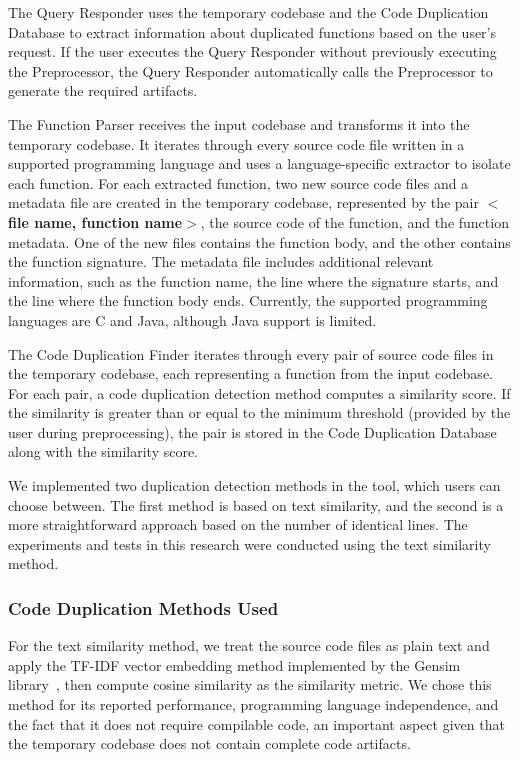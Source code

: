 \documentclass[conference]{IEEEtran}
\begin{document}
The Query Responder uses the temporary codebase and the Code Duplication Database to extract 
information about duplicated functions based on the user's request. If the user executes the Query Responder
without previously executing the Preprocessor, the Query Responder automatically 
calls the Preprocessor to generate the required artifacts.

The Function Parser receives the input codebase and transforms it into the temporary
codebase. It iterates through every source code file written in a supported programming 
language and uses a language-specific extractor to isolate each function. For each extracted 
function, two new source code files and a metadata file are created in the temporary codebase, 
represented by the pair \textbf{$<$file name, function name$>$}, the source code of the function, 
and the function metadata. One of the new files contains the function body, and the other 
contains the function signature. The metadata file includes additional relevant information,
such as the function name, the line where the signature starts, and the line where the function 
body ends. Currently, the supported programming languages are C and Java, although Java support is limited.

The Code Duplication Finder iterates through every pair of source code files in the
temporary codebase, each representing a function from the input codebase. For each pair,
a code duplication detection method computes a similarity score. If the similarity is greater 
than or equal to the minimum threshold (provided by the user during preprocessing), the pair 
is stored in the Code Duplication Database along with the similarity score.

We implemented two duplication detection methods in the tool, which users can choose 
between. The first method is based on text similarity, and the second is a more straightforward approach 
based on the number of identical lines. The experiments and tests in this research were 
conducted using the text similarity method.


\subsubsection{Code Duplication Methods Used}

For the text similarity method, we treat the source code files as plain text and apply the
TF-IDF vector embedding method implemented by the Gensim library~\cite{gensim},
then compute cosine similarity as the similarity metric. We chose this method for 
its reported performance, programming language independence, and the fact that it does 
not require compilable code, an important aspect given that the
temporary codebase does not contain complete code artifacts.
\end{document}
